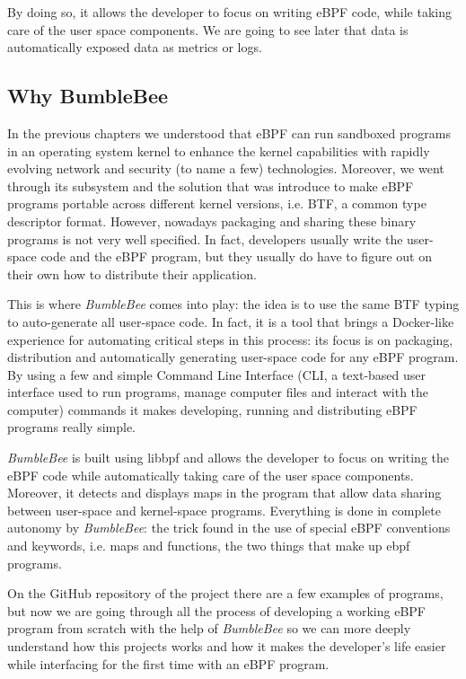 By doing so, it allows the developer to focus on writing eBPF code, while taking care of the user space components.
We are going to see later that data is automatically exposed data as metrics or logs.

\subsection{Why BumbleBee}

In the previous chapters we understood that eBPF can run sandboxed programs in an operating system kernel to enhance the kernel capabilities with rapidly evolving network and security (to name a few) technologies.
Moreover, we went through its subsystem and the solution that was introduce to make eBPF programs portable across different kernel versions, i.e. BTF, a common type descriptor format.
However, nowadays packaging and sharing these binary programs is not very well specified. 
In fact, developers usually write the user-space code and the eBPF program, but they usually do have to figure out on their own how to distribute their application.

This is where \textit{BumbleBee} comes into play: the idea is to use the same BTF typing to auto-generate all user-space code.
In fact, it is a tool that brings a Docker-like experience for automating critical steps in this process: its focus is on packaging, distribution and automatically generating user-space code for any eBPF program. 
By using a few and simple Command Line Interface (CLI, a text-based user interface
used to run programs, manage computer files and interact with the computer) commands it makes developing, running and distributing eBPF programs really simple.

\textit{BumbleBee} is built using libbpf and allows the developer to focus on writing the eBPF code while automatically taking care of the user space components. 
Moreover, it detects and displays maps in the program that allow data sharing between user-space and kernel-space programs. 
Everything is done in complete autonomy by \textit{BumbleBee}: the trick found in the use of special eBPF conventions and keywords, i.e. maps and functions, the two things that make up ebpf programs.

On the GitHub repository of the project there are a few examples of programs, but now we are going through all the process of developing a working eBPF program from scratch with the help of \textit{BumbleBee} so we can more deeply understand how this projects works and how it makes the developer's life easier while interfacing for the first time with an eBPF program.

